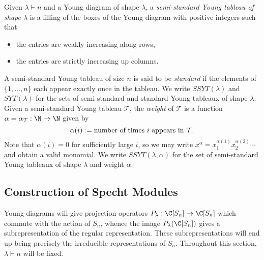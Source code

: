 \documentclass[../main.tex]{subfiles}
\begin{document}
\begin{definition}\label{def:youngtableaux}
  Given $ \lambda\vdash n $ and a Young diagram of shape $ \lambda $, a \textit{semi-standard Young tableau of shape $ \lambda $} is a filling of the boxes of the Young diagram with positive integers such that 
  \begin{itemize}
    \item the entries are weakly increasing along rows,
    \item the entries are strictly increasing up columns.
  \end{itemize}
  A semi-standard Young tableau of size $ n $ is said to be \textit{standard} if the elements of $ \{1,\ldots,n\} $ each appear exactly once in the tableau. We write $ SSYT(\lambda) $ and $ SYT(\lambda) $ for the sets of semi-standard and standard Young tableaux of shape $ \lambda $. Given a semi-standard Young tableau $ \mathcal{T} $, the \textit{weight} of $ \mathcal{T} $ is a function $ \alpha=\alpha_{\mathcal{T}}:\N \to \N$ given by
  \[
    \alpha(i) := \text{number of times $ i $ appears in $ \mathcal{T} $}.
  \]
  Note that $ \alpha(i) = 0 $ for sufficiently large $ i $, so we may write $ x^{\alpha} = x_{1}^{\alpha(1)}x_{2}^{\alpha(2)} \cdots $ and obtain a valid monomial. We write $ SSYT(\lambda,\alpha) $ for the set of semi-standard Young tableaux of shape $ \lambda $ and weight $ \alpha $.
\end{definition}




\subsection{Construction of Specht Modules}
Young diagrams will give projection operators $ P_{\lambda}:\C[S_{n}]\to\C[S_{n}] $ which commute with the action of $ S_{n} $, whence the image $ P_{\lambda}(\C[S_{n}]) $ gives a subrepresentation of the regular representation. These subrepresentations will end up being precisely the irreducible representations of $ S_{n} $. Throughout this section, $ \lambda\vdash n$ will be fixed.\\
\end{document}
